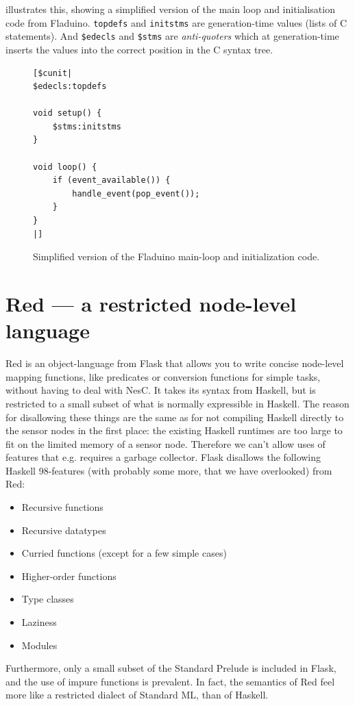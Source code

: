 \documentclass[a4paper, oneside, final]{memoir}
\let\Fref\undefined
\begin{document}
\Fref{fig:mainloop} illustrates this, showing a simplified
version of the main loop and initialisation code from Fladuino.
\texttt{topdefs} and \texttt{initstms} are generation-time values
(lists of C statements). And \texttt{\$edecls} and \texttt{\$stms} are
\textit{anti-quoters} which at generation-time inserts the values into
the correct position in the C syntax tree.

\begin{figure}
\begin{verbatim}
[$cunit|
$edecls:topdefs

void setup() {
    $stms:initstms
}

void loop() {
    if (event_available()) {
        handle_event(pop_event());
    }
}
|]
\end{verbatim}
\caption{Simplified version of the Fladuino main-loop and
  initialization code.}
\label{fig:mainloop}
\end{figure}

\section{Red --- a restricted node-level language}
\label{sec:red}
Red is an object-language from Flask that allows you to write concise
node-level mapping functions, like predicates or conversion functions
for simple tasks, without having to deal with NesC. It takes its syntax
from Haskell, but is restricted to a small subset of what is
normally expressible in Haskell. The reason for disallowing these
things are the same as for not compiling Haskell directly to the
sensor nodes in the first place: the existing Haskell runtimes are too
large to fit on the limited memory of a sensor node. Therefore we can't
allow uses of features that e.g.  requires a garbage collector. Flask
disallows the following Haskell 98-features (with probably some more,
that we have overlooked) from Red:
\begin{itemize}
\item Recursive functions
\item Recursive datatypes
\item Curried functions (except for a few simple cases)
\item Higher-order functions
\item Type classes
\item Laziness
\item Modules
\end{itemize}

Furthermore, only a small subset of the Standard Prelude is included
in Flask, and the use of impure functions is prevalent.  In fact, the
semantics of Red feel more like a restricted dialect of Standard ML,
than of Haskell.
\end{document}
